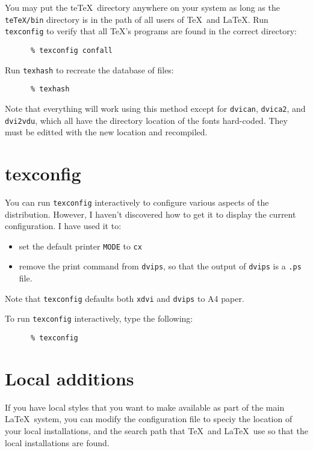 \documentclass[11pt,twoside]{article}
\newcommand{\xlabel}[1]{}
\begin{document}
You may put the te\TeX\ directory anywhere on your system as long as
the \texttt{teTeX/bin} directory is in the path of all users of
\TeX\ and \LaTeX.  Run \texttt{texconfig} to verify that all \TeX's
programs are found in the correct directory:

\begin{verbatim}
      % texconfig confall
\end{verbatim}

Run \texttt{texhash} to recreate the database of files:

\begin{verbatim}
      % texhash
\end{verbatim}

Note that everything will work using this method except for
\texttt{dvican}, \texttt{dvica2}, and \texttt{dvi2vdu}, which all have
the directory location of the fonts hard-coded. They must be editted
with the new location and recompiled.

\section{texconfig\xlabel{texconfig}}

You can run \texttt{texconfig} interactively to configure various
aspects of the distribution. However, I haven't discovered how to get
it to display the current configuration. I have used it to:

\begin{itemize}
  \item set the default printer \texttt{MODE} to \texttt{cx}
  \item remove the print command from \texttt{dvips}, so that the output of 
        \texttt{dvips} is a \texttt{.ps} file.
\end{itemize}

Note that \texttt{texconfig} defaults both \texttt{xdvi} and \texttt{dvips} 
to A4 paper.

To run \texttt{texconfig} interactively, type the following:

\begin{verbatim}
      % texconfig
\end{verbatim}

\section{\xlabel{local-config}Local additions}

If you have local styles that you want to make available as part of the
main \LaTeX\ system, you can modify the configuration file to speciy the
location of your local installations, and the search path that \TeX\ and
\LaTeX\ use so that the local installations are found.
\end{document}
